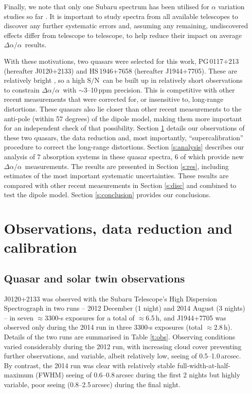 \documentclass[fleqn,usenatbib,usedcolumn]{mnras}
\newcommand{\Sref}[1]{Section \ref{#1}}
\newcommand{\Tref}[1]{Table \ref{#1}}
\newcommand{\SN}{\ensuremath{\textrm{S/N}}}
\newcommand{\daa}{\ensuremath{\Delta\alpha/\alpha}}
\begin{document}
Finally, we note that only one Subaru spectrum has been utilised for $\alpha$ variation studies so far \citep{Evans:2014:128}. It is important to study spectra from all available telescopes to discover any further systematic errors and, assuming any remaining, undiscovered effects differ from telescope to telescope, to help reduce their impact on average \daa\ results.

With these motivations, two quasars were selected for this work, PG\,0117$+$213 (hereafter J0120$+$2133) and HS\,1946$+$7658 (hereafter J1944$+$7705). These are relatively bright \citep[UK $R$ magnitudes in the SuperCosmos survey of $\approx$15.6\,mag;][]{Hambly:2001:1279}, so a high \SN\ can be built up in relatively short observations to constrain \daa\ with $\sim$3--10\,ppm precision. This is competitive with other recent measurements that were corrected for, or insensitive to, long-range distortions. These quasars also lie closer than other recent measurements to the anti-pole (within 57 degrees) of the dipole model, making them more important for an independent check of that possibility. \Sref{s:obs} details our observations of these two quasars, the data reduction and, most importantly, ``supercalibration'' procedure to correct the long-range distortions. \Sref{s:analysis} describes our analysis of 7 absorption systems in these quasar spectra, 6 of which provide new \daa\ measurements. The results are presented in \Sref{s:res}, including estimates of the most important systematic uncertainties. These results are compared with other recent measurements in \Sref{s:disc} and combined to test the dipole model. \Sref{s:conclusion} provides our conclusions.


\section{Observations, data reduction and calibration}\label{s:obs}

\subsection{Quasar and solar twin observations}\label{ss:obs}

J0120$+$2133 was observed with the Subaru Telescope's High Dispersion Spectrograph \citep[HDS;][]{Noguchi:2002:855} in two runs -- 2012 December (1 night) and 2014 August (3 nights) -- in seven $\approx$3300-s exposures for a total of $\approx$6.5\,h, and J1944$+$7705 was observed only during the 2014 run in three 3300-s exposures (total $\approx$2.8\,h). Details of the two runs are summarised in \Tref{t:obs}. Observing conditions varied considerably during the 2012 run, with increasing cloud cover preventing further observations, and variable, albeit relatively low, seeing of 0.5--1.0\,arcsec. By contrast, the 2014 run was clear with relatively stable full-width-at-half-maximum (FWHM) seeing of 0.6--0.8\,arcsec during the first 2 nights but highly variable, poor seeing (0.8--2.5\,arcsec) during the final night.
\end{document}

